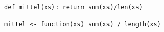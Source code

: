 \documentclass{article}
\begin{document}
\begin{verbatim}
def mittel(xs): return sum(xs)/len(xs)
\end{verbatim}
\begin{verbatim}
mittel <- function(xs) sum(xs) / length(xs)
\end{verbatim}
\end{document}
